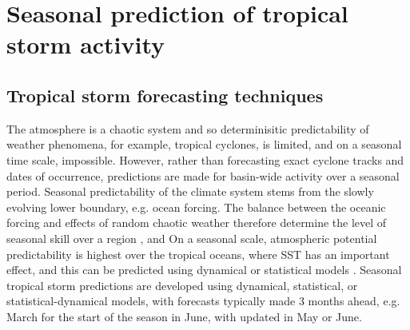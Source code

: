 




\section{Seasonal prediction of tropical storm activity} %

\subsection{Tropical storm forecasting techniques} %


The atmosphere is a chaotic system and so determinisitic predictability of weather phenomena, for example, tropical cyclones, is limited, and on a seasonal time scale, impossible. However, rather than forecasting exact cyclone tracks and dates of occurrence, predictions are made for basin-wide activity over a seasonal period.
Seasonal predictability of the climate system stems from the slowly evolving lower boundary, e.g. ocean forcing. The balance between the oceanic forcing and effects of random chaotic weather therefore determine the level of seasonal skill over a region \citep{rowell1998assessing}, and On a seasonal scale, atmospheric potential predictability is highest over the tropical oceans, where SST has an important effect, and this can be predicted using dynamical or statistical models \citep{rowell1998assessing}.
Seasonal tropical storm predictions are developed using dynamical, statistical, or statistical-dynamical models, with forecasts typically made 3 months ahead, e.g. March for the start of the season in June, with updated in May or June. 


